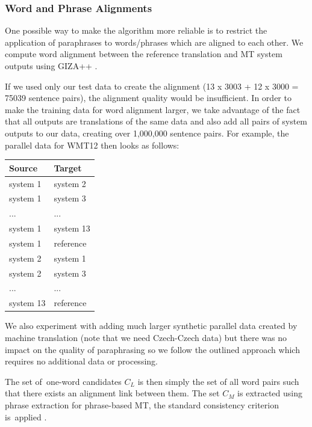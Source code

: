 


\subsubsection{Word and Phrase Alignments}

One possible way to make the algorithm more reliable is to restrict the
application of paraphrases to words/phrases which are aligned to each other. 
We compute word alignment between the reference translation and MT system
outputs using GIZA++ \citep{gizapp}.

If we used only our test data to create the alignment (13 x 3003 + 12 x 3000 
= 75039 sentence pairs), the alignment quality would be insufficient. In order 
to make the training data for word alignment larger, we take advantage of the 
fact that all outputs are translations of the same data and also add all pairs 
of system outputs to our data, creating over 1,000,000  sentence
pairs. For example, the parallel data for WMT12 then looks as follows:

\begin{center}
\begin{tabular}{ll}
Source & Target \\
\hline
system 1 & system 2 \\
system 1 & system 3 \\
... & ...\\
system 1 & system 13 \\
system 1 & reference \\
system 2 & system 1 \\
system 2 & system 3 \\
... & ... \\
system 13 & reference \\
\end{tabular}
\end{center}

We also experiment with adding much larger synthetic parallel data created by
machine translation (note that we need Czech-Czech data) but there was no impact
on the quality of paraphrasing so we follow the outlined approach which requires
no additional data or processing.

The set of~one-word candidates $C_L$ is then simply the set of all word pairs such
that there exists an alignment link between them. The set $C_M$ is extracted
using phrase extraction for phrase-based MT, the standard consistency criterion
is~applied \citep{Och99improvedalignment}.

